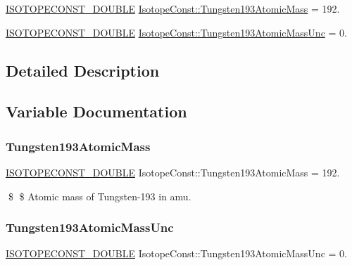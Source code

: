 \begin{DoxyCompactItemize}
\item 
\mbox{\hyperlink{group___isotope_const-_macros_ga8f45a7272ce02c0b4c65c44636ed719a}{I\+S\+O\+T\+O\+P\+E\+C\+O\+N\+S\+T\+\_\+\+D\+O\+U\+B\+LE}} \mbox{\hyperlink{group___isotope_const-_tungsten-_w193_ga78803118fc5eaaed8079ff0d3126bb64}{Isotope\+Const\+::\+Tungsten193\+Atomic\+Mass}} = 192.
\item 
\mbox{\hyperlink{group___isotope_const-_macros_ga8f45a7272ce02c0b4c65c44636ed719a}{I\+S\+O\+T\+O\+P\+E\+C\+O\+N\+S\+T\+\_\+\+D\+O\+U\+B\+LE}} \mbox{\hyperlink{group___isotope_const-_tungsten-_w193_ga1069c00dd543c65a1a266f18c252f48d}{Isotope\+Const\+::\+Tungsten193\+Atomic\+Mass\+Unc}} = 0.
\end{DoxyCompactItemize}


\subsection{Detailed Description}


\subsection{Variable Documentation}
\mbox{\label{group___isotope_const-_tungsten-_w193_ga78803118fc5eaaed8079ff0d3126bb64}} 
\subsubsection{\texorpdfstring{Tungsten193\+Atomic\+Mass}{Tungsten193AtomicMass}}
{\footnotesize\ttfamily \mbox{\hyperlink{group___isotope_const-_macros_ga8f45a7272ce02c0b4c65c44636ed719a}{I\+S\+O\+T\+O\+P\+E\+C\+O\+N\+S\+T\+\_\+\+D\+O\+U\+B\+LE}} Isotope\+Const\+::\+Tungsten193\+Atomic\+Mass = 192.}

\$ \$ Atomic mass of Tungsten-\/193 in amu. \mbox{\label{group___isotope_const-_tungsten-_w193_ga1069c00dd543c65a1a266f18c252f48d}} 
\subsubsection{\texorpdfstring{Tungsten193\+Atomic\+Mass\+Unc}{Tungsten193AtomicMassUnc}}
{\footnotesize\ttfamily \mbox{\hyperlink{group___isotope_const-_macros_ga8f45a7272ce02c0b4c65c44636ed719a}{I\+S\+O\+T\+O\+P\+E\+C\+O\+N\+S\+T\+\_\+\+D\+O\+U\+B\+LE}} Isotope\+Const\+::\+Tungsten193\+Atomic\+Mass\+Unc = 0.}

